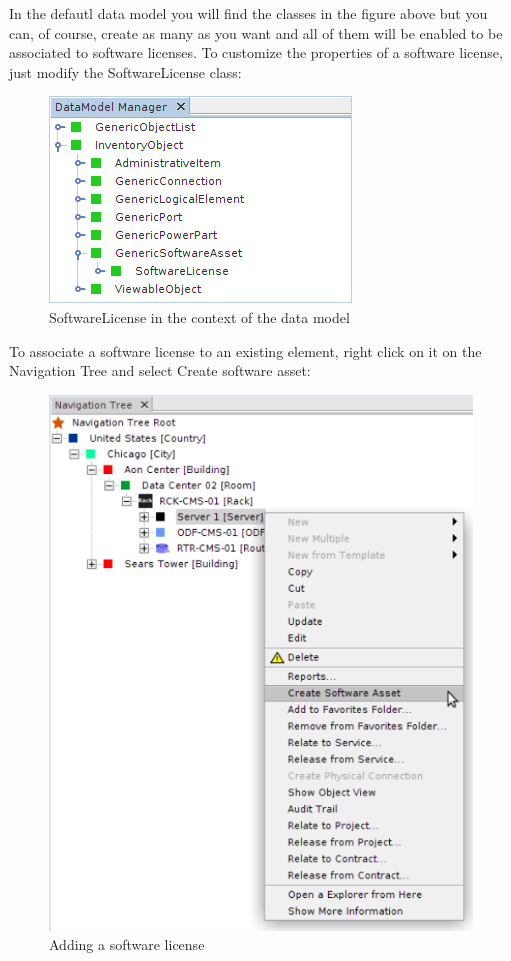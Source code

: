 \documentclass[a4paper]{article}
\begin{document}
	    In the defautl data model you will find the classes in the figure above but you can, of course, create as many as you want and all of them will be enabled to be associated to software licenses. To customize the properties of a software license, just modify the SoftwareLicense class:
	    \begin{figure}[h!]
	    	\centering
	    	\includegraphics[width=0.5\linewidth]{img/software_asset_data_model_software_asset.png}
	    	\caption{SoftwareLicense in the context of the data model}
	    	\label{fig:software_asset_data_model_software_asset}
	    \end{figure}
	    
	    To associate a software license to an existing element, right click on it on the Navigation Tree and select Create software asset:
		\begin{figure}[h!]
	     	\centering
	     	\includegraphics[width=0.5\linewidth]{img/software_asset_action.png}
	     	\caption{Adding a software license}
	     	\label{fig:software_asset_action}
		\end{figure}
	    
\end{document}
